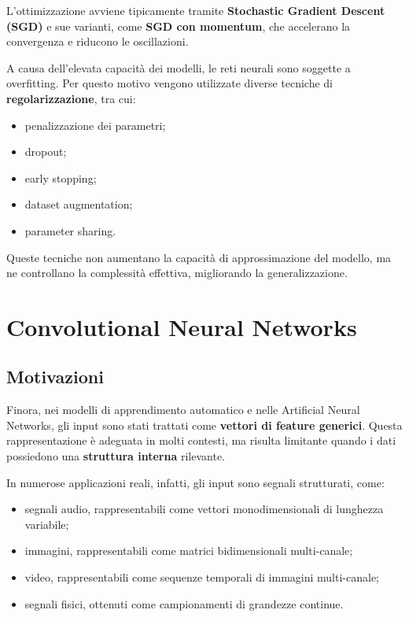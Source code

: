 \documentclass[a4paper,12pt]{report}
\begin{document}
\begin{tcolorbox}[
    colback=green!5,
    colframe=green!50!black,
    title= Artificial Neural Networks,
    breakable
]
L’ottimizzazione avviene tipicamente tramite \textbf{Stochastic Gradient Descent (SGD)} e sue varianti, come \textbf{SGD con momentum}, che accelerano la convergenza e riducono le oscillazioni.

A causa dell’elevata capacità dei modelli, le reti neurali sono soggette a overfitting.  
Per questo motivo vengono utilizzate diverse tecniche di \textbf{regolarizzazione}, tra cui:
\begin{itemize}
    \item penalizzazione dei parametri;
    \item dropout;
    \item early stopping;
    \item dataset augmentation;
    \item parameter sharing.
\end{itemize}

Queste tecniche non aumentano la capacità di approssimazione del modello, ma ne controllano la complessità effettiva, migliorando la generalizzazione.

\end{tcolorbox}

\chapter{Convolutional Neural Networks}

\section{Motivazioni}

Finora, nei modelli di apprendimento automatico e nelle Artificial Neural Networks, gli input sono stati trattati come \textbf{vettori di feature generici}.  
Questa rappresentazione è adeguata in molti contesti, ma risulta limitante quando i dati possiedono una \textbf{struttura interna} rilevante.

In numerose applicazioni reali, infatti, gli input sono segnali strutturati, come:
\begin{itemize}
    \item segnali audio, rappresentabili come vettori monodimensionali di lunghezza variabile;
    \item immagini, rappresentabili come matrici bidimensionali multi-canale;
    \item video, rappresentabili come sequenze temporali di immagini multi-canale;
    \item segnali fisici, ottenuti come campionamenti di grandezze continue.
\end{itemize}
\end{document}
